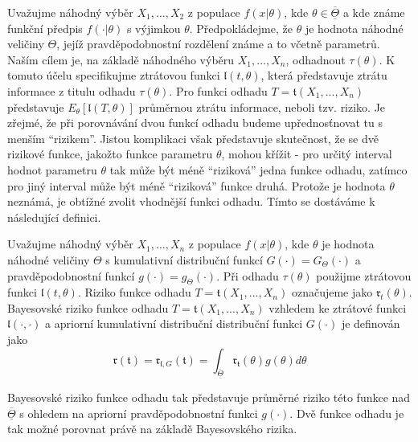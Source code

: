 Uvažujme náhodný výběr $X_1, ..., X_2$ z populace $f(x|\theta)$, kde $\theta \in \overline{\underline{\Theta}}$ a kde známe funkční předpis $f(\cdot|\theta)$ s výjimkou $\theta$. Předpokládejme, že $\theta$ je hodnota náhodné veličiny $\Theta$, jejíž pravděpodobnostní rozdělení známe a to včetně parametrů. Naším cílem je, na základě náhodného výběru $X_1, ..., X_n$, odhadnout $\tau(\theta)$. K tomuto účelu specifikujme ztrátovou funkci $\mathfrak{l}(t, \theta)$, která představuje ztrátu informace z titulu odhadu $\tau(\theta)$. Pro funkci odhadu $T = \mathfrak{t}(X_1, ..., X_n)$ představuje $E_{\theta}[\mathfrak{l}(T, \theta)]$ průměrnou ztrátu informace, neboli tzv. riziko. Je zřejmé, že při porovnávání dvou funkcí odhadu budeme upřednosťnovat tu s menším ``rizikem''. Jistou komplikaci však představuje skutečnost, že se dvě rizikové funkce, jakožto funkce parametru $\theta$, mohou křížit - pro určitý interval hodnot parametru $\theta$ tak může být méně ``riziková'' jedna funkce odhadu, zatímco pro jiný interval může být méně ``riziková'' funkce druhá. Protože je hodnota $\theta$ neznámá, je obtížné zvolit vhodnější funkci odhadu. Tímto se dostáváme k následující definici.

\begin{definition}
Uvažujme náhodný výběr $X_1, ..., X_n$ z populace $f(x|\theta)$, kde $\theta$ je hodnota náhodné veličiny $\Theta$ s kumulativní distribuční funkcí $G(\cdot) = G_{\Theta}(\cdot)$ a pravděpodobnostní funkcí $g(\cdot) = g_{\Theta}(\cdot)$. Při odhadu $\tau(\theta)$ použijme ztrátovou funkci $\mathfrak{l}(t, \theta)$. Riziko funkce odhadu $T = \mathfrak{t}(X_1, ..., X_n)$ označujeme jako $\mathfrak{r}_t(\theta)$. Bayesovské riziko funkce odhadu $T = \mathfrak{t}(X_1, ..., X_n)$ vzhledem ke ztrátové funkci $\mathfrak{l}(\cdot, \cdot)$ a apriorní kumulativní distribuční distribuční funkci $G(\cdot)$ je definován jako
\begin{equation*}
\mathfrak{r}(\mathfrak{t}) = \mathfrak{r}_{\mathfrak{l}, G}(\mathfrak{t}) = \int_{\overline{\underline{\Theta}}} \mathfrak{r}_{\mathfrak{t}}(\theta)g(\theta)d \theta
\end{equation*}
\end{definition}

Bayesovské riziko funkce odhadu tak představuje průměrné riziko této funkce nad $\overline{\underline{\Theta}}$ s ohledem na apriorní pravděpodobnostní funkci $g(\cdot)$. Dvě funkce odhadu je tak možné porovnat právě na základě Bayesovského rizika.


